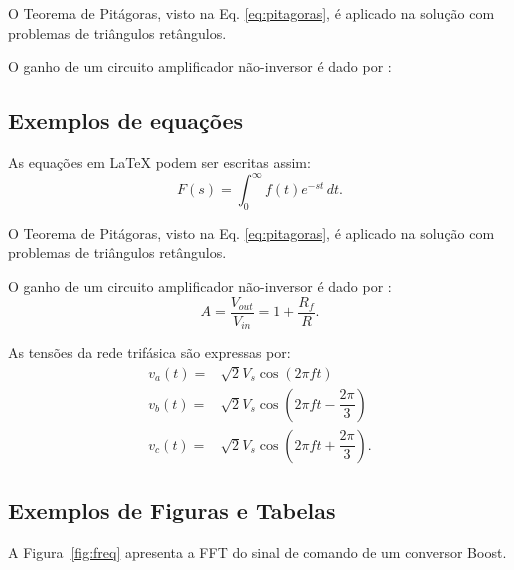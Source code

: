 \documentclass{article}
\begin{document}
O Teorema de Pitágoras, visto na Eq. \eqref{eq:pitagoras}, é aplicado na solução com problemas de triângulos retângulos.

O ganho de um circuito amplificador não-inversor é dado por \cite{ApostilaAldo}:

\subsection{Exemplos de equações}

As equações em LaTeX podem ser escritas assim:
\begin{equation}
    F(s) = \int_0^\infty f(t) e^{-st} \,dt. \label{eq:pitagoras}
\end{equation}


O Teorema de Pitágoras, visto na Eq. \linebreak \eqref{eq:pitagoras}, é aplicado na solução com problemas de triângulos retângulos.

O ganho de um circuito amplificador não-inversor é dado por \cite{ApostilaAldo}: %
\begin{equation}
    A = \dfrac{V_{out}}{V_{in}} = 1+\dfrac{R_f}{R}.
\end{equation}

As tensões da rede trifásica são expressas por:
\begin{align}
    v_a(t) = & \sqrt{2} V_s\cos(2\pi f t) \\
    v_b(t) = & \sqrt{2} V_s\cos\left(2\pi f t - \dfrac{2\pi}{3}\right) \\
    v_c(t) = & \sqrt{2} V_s\cos\left(2\pi f t + \dfrac{2\pi}{3}\right).
\end{align}

\subsection{Exemplos de Figuras e Tabelas}

A Figura~\ref{fig:freq} apresenta a FFT do sinal de comando de um conversor Boost.
\end{document}
